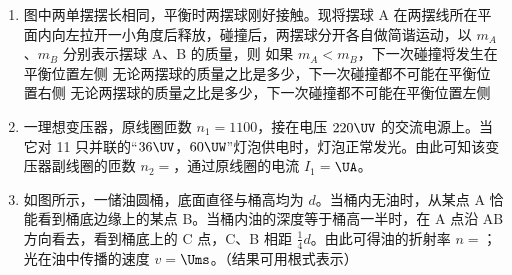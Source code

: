 \documentclass[\gkver]{gaokaozhenti}
\begin{document}
\begin{enumerate}
\item
图中两单摆摆长相同，平衡时两摆球刚好接触。现将摆球 A 在两摆线所在平面内向左拉开一小角度后释放，碰撞后，两摆球分开各自做简谐运动，以 $m_{A}$、$m_{B}$ 分别表示摆球 A、B 的质量，则
\onepicture[w=3.5cm]{}
{如果 $m_{A}<m_{B}$，下一次碰撞将发生在平衡位置左侧}
{无论两摆球的质量之比是多少，下一次碰撞都不可能在平衡位置右侧}
{无论两摆球的质量之比是多少，下一次碰撞都不可能在平衡位置左侧}


\item
一理想变压器，原线圈匝数 $n_{1}=1100$，接在电压 $220\UV$ 的交流电源上。当它对 11 只并联的“$36\UV$，$60\UW$”灯泡供电时，灯泡正常发光。由此可知该变压器副线圈的匝数 $n_{2}=$，通过原线圈的电流 $I_{1}=$$\UA$。



\item
如图所示，一储油圆桶，底面直径与桶高均为 $d$。当桶内无油时，从某点 A 恰能看到桶底边缘上的某点 B。当桶内油的深度等于桶高一半时，在 A 点沿 AB 方向看去，看到桶底上的 C 点，C、B 相距 $\frac{1}{4}d$。由此可得油的折射率 $n=$；光在油中传播的速度 $v=$$\Ums$。（结果可用根式表示）
\onepicture[align=right, w=5cm]{}


\end{enumerate}
\end{document}

